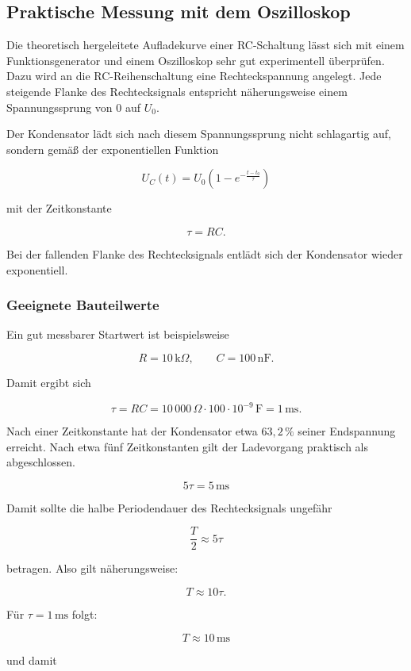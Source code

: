 \subsection{Praktische Messung mit dem Oszilloskop}
\label{subsec:rc-schaltung-oszilloskop}

Die theoretisch hergeleitete Aufladekurve einer RC-Schaltung lässt sich mit
einem Funktionsgenerator und einem Oszilloskop sehr gut experimentell
überprüfen. Dazu wird an die RC-Reihenschaltung eine Rechteckspannung angelegt.
Jede steigende Flanke des Rechtecksignals entspricht näherungsweise einem
Spannungssprung von $0$ auf $U_0$.

Der Kondensator lädt sich nach diesem Spannungssprung nicht schlagartig auf,
sondern gemäß der exponentiellen Funktion

\[
U_C(t)=U_0\left(1-e^{-\frac{t-t_0}{\tau}}\right)
\]

mit der Zeitkonstante

\[
\tau=RC.
\]

Bei der fallenden Flanke des Rechtecksignals entlädt sich der Kondensator
wieder exponentiell.

\subsubsection{Geeignete Bauteilwerte}
\label{subsubsec:geeignete-bauteilwerte-rc}

Ein gut messbarer Startwert ist beispielsweise

\[
R = 10\,\text{k}\Omega,
\qquad
C = 100\,\text{nF}.
\]

Damit ergibt sich

\[
\tau = RC
=
10\,000\,\Omega \cdot 100 \cdot 10^{-9}\,\text{F}
=
1\,\text{ms}.
\]

Nach einer Zeitkonstante hat der Kondensator etwa $63{,}2\,\%$ seiner
Endspannung erreicht. Nach etwa fünf Zeitkonstanten gilt der Ladevorgang
praktisch als abgeschlossen.

\[
5\tau = 5\,\text{ms}
\]

Damit sollte die halbe Periodendauer des Rechtecksignals ungefähr

\[
\frac{T}{2} \approx 5\tau
\]

betragen. Also gilt näherungsweise:

\[
T \approx 10\tau.
\]

Für $\tau = 1\,\text{ms}$ folgt:

\[
T \approx 10\,\text{ms}
\]

und damit

